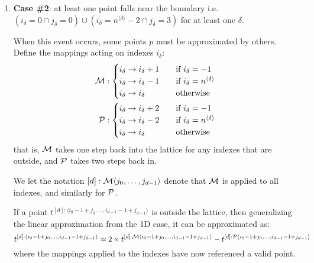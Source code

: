 \documentclass[11pt]{article}
\begin{document}
\begin{enumerate}
\item \textbf{Case \#2}: at least one point falls near the boundary i.e. $( i_\delta = 0 \cap j_\delta = 0 ) \cup ( i_\delta = n^{\langle \delta \rangle}-2 \cap j_\delta = 3)$ for at least one $\delta$.

When this event occurs, some points $p$ must be approximated by others. Define the mappings acting on indexes $i_\delta$:
\begin{equation}
\begin{split}
{\cal M} : \begin{cases}
	i_\delta \rightarrow i_\delta + 1 \quad &\text{if } i_\delta=-1 \\
	i_\delta \rightarrow i_\delta - 1 \quad &\text{if } i_\delta = n^{\langle \delta \rangle} \\
	i_\delta \rightarrow i_\delta \quad &\text{otherwise}
\end{cases} \\
{\cal P} : \begin{cases}
	i_\delta \rightarrow i_\delta + 2 \quad &\text{if } i_\delta=-1 \\
	i_\delta \rightarrow i_\delta - 2 \quad &\text{if } i_\delta = n^{\langle \delta \rangle} \\
	i_\delta \rightarrow i_\delta \quad &\text{otherwise}
\end{cases}
\end{split}
\end{equation}
that is, ${\cal M}$ takes one step back into the lattice for any indexes that are outside, and ${\cal P}$ takes two steps back in.

We let the notation $[d]: {\cal M} \langle j_0, \dots, j_{d-1} \rangle$ denote that ${\cal M}$ is applied to all indexes, and similarly for ${\cal P}$.

If a point $t^{[d]:\langle i_0-1+j_0, \dots, i_{d-1}-1+j_{d-1} \rangle}$ is outside the lattice, then generalizing the linear approximation from the 1D case, it can be approximated as:
\begin{equation*}
t^{[d]:\langle i_0-1+j_0, \dots, i_{d-1}-1+j_{d-1} \rangle} \approx 2 \times t^{[d]:{\cal M}\langle i_0-1+j_0, \dots, i_{d-1}-1+j_{d-1} \rangle} - t^{[d]:{\cal P}\langle i_0-1+j_0, \dots, i_{d-1}-1+j_{d-1} \rangle}
\end{equation*}
where the mappings applied to the indexes have now referenced a valid point.

\end{enumerate}
\end{document}
